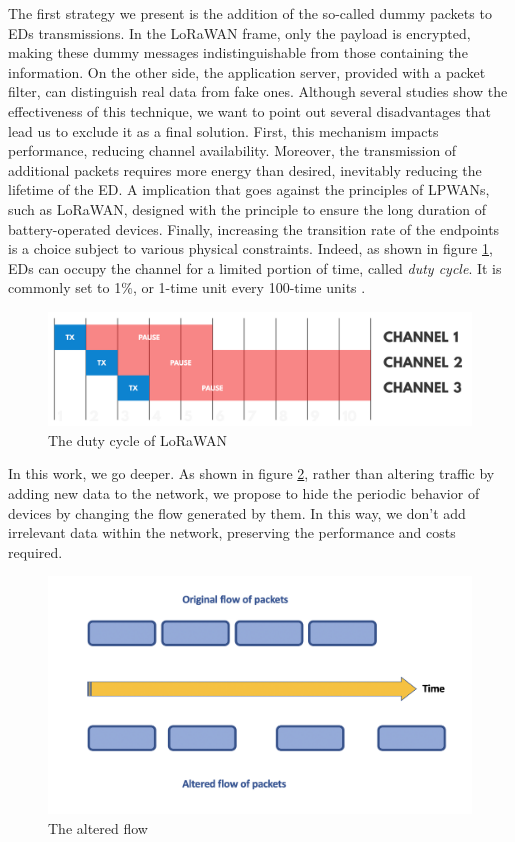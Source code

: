 \vspace{5mm}

The first strategy we present is the addition of the so-called dummy packets to EDs transmissions. In the LoRaWAN frame, only the payload is encrypted, making these dummy messages indistinguishable from those containing the information. On the other side, the application server, provided with a packet filter, can distinguish real data from fake ones. 
Although several studies \cite{5283315} show the effectiveness of this technique, we want to point out several disadvantages that lead us to exclude it as a final solution. First, this mechanism impacts performance, reducing channel availability. Moreover, the transmission of additional packets requires more energy than desired, inevitably reducing the lifetime of the ED. A implication that goes against the principles of LPWANs, such as LoRaWAN, designed with the principle to ensure the long duration of battery-operated devices. Finally, increasing the transition rate of the endpoints is a choice subject to various physical constraints. Indeed, as shown in figure \ref{fig:duty_cycle}, EDs can occupy the channel for a limited portion of time, called  \textit{duty cycle}. It is commonly set to 1\%, or 1-time unit every 100-time units \cite{8030482}.

\vspace{3mm}
\begin{figure}[H]
    \centering
    \includegraphics[width=0.7\linewidth]{images/countermeasures/duty_cycle.png}
    \caption{The duty cycle of LoRaWAN}
    \label{fig:duty_cycle}
\end{figure}
\vspace{3mm}

In this work, we go deeper. As shown in figure \ref{fig:flow}, rather than altering traffic by adding new data to the network, we propose to hide the periodic behavior of devices by changing the flow generated by them. In this way, we don't add irrelevant data within the network, preserving the performance and costs required. 

\vspace{3mm}
\begin{figure}[H]
    \centering
    \includegraphics[width=0.7\linewidth]{images/countermeasures/flow.png}
    \caption{The altered flow}
    \label{fig:flow}
\end{figure}
\vspace{3mm}

